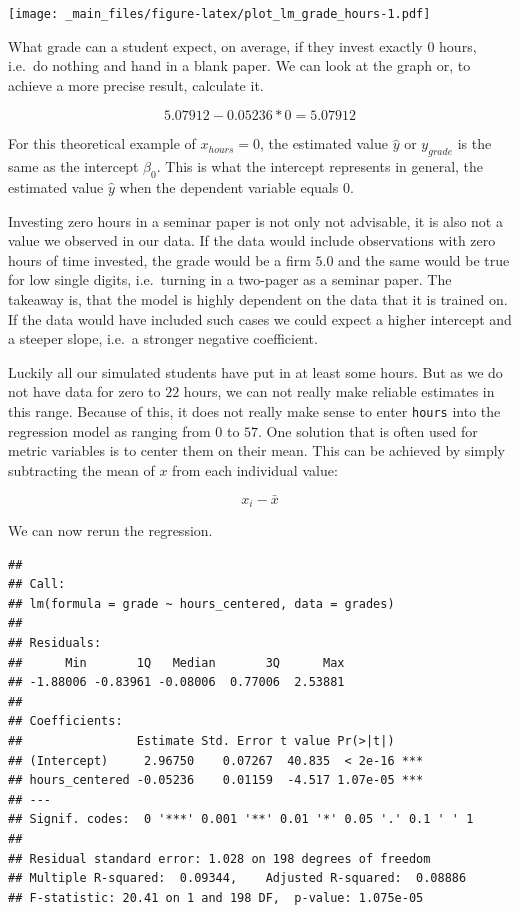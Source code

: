 \documentclass[
]{book}
\begin{document}
\texttt{[image: \_main\_files/figure-latex/plot\_lm\_grade\_hours-1.pdf]}

What grade can a student expect, on average, if they invest exactly 0
hours, i.e.~do nothing and hand in a blank paper. We can look at the graph or,
to achieve a more precise result, calculate it.

\[5.07912 -0.05236 * 0 = 5.07912\]

For this theoretical example of \(x_{hours} = 0\), the estimated value \(\hat{y}\)
or \(y_{grade}\) is the same as the intercept \(\beta_0\). This is what the
intercept represents in general, the estimated value \(\hat{y}\) when the
dependent variable equals \(0\).

Investing zero hours in a seminar paper is not only not advisable, it is
also not a value we observed in our data. If the data would include observations
with zero hours of time invested, the grade would be a firm \(5.0\) and the same
would be true for low single digits, i.e.~turning in a two-pager as a seminar
paper. The takeaway is, that the model is highly dependent on the data that it
is trained on. If the data would have included such cases we could expect a
higher intercept and a steeper slope, i.e.~a stronger negative coefficient.

Luckily all our simulated students have put in at least some hours. But as we do
not have data for zero to \(22\) hours, we can not really make reliable estimates
in this range. Because of this, it does not really make sense to enter \texttt{hours}
into the regression model as ranging from \(0\) to \(57\). One solution that is
often used for metric variables is to center them on their mean. This can be
achieved by simply subtracting the mean of \(x\) from each individual value:

\[x_i - \bar{x}\]

We can now rerun the regression.

\begin{verbatim}
## 
## Call:
## lm(formula = grade ~ hours_centered, data = grades)
## 
## Residuals:
##      Min       1Q   Median       3Q      Max 
## -1.88006 -0.83961 -0.08006  0.77006  2.53881 
## 
## Coefficients:
##                Estimate Std. Error t value Pr(>|t|)    
## (Intercept)     2.96750    0.07267  40.835  < 2e-16 ***
## hours_centered -0.05236    0.01159  -4.517 1.07e-05 ***
## ---
## Signif. codes:  0 '***' 0.001 '**' 0.01 '*' 0.05 '.' 0.1 ' ' 1
## 
## Residual standard error: 1.028 on 198 degrees of freedom
## Multiple R-squared:  0.09344,    Adjusted R-squared:  0.08886 
## F-statistic: 20.41 on 1 and 198 DF,  p-value: 1.075e-05
\end{verbatim}
\end{document}
